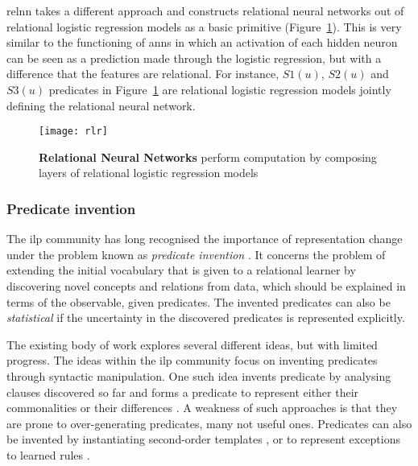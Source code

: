 \gls{relnn} takes a different approach and constructs relational neural networks out of relational logistic regression models as a basic primitive (Figure~\ref{fig:relnn}).
This is very similar to the functioning of \gls{ann}s in which an activation of each hidden neuron can be seen as a prediction made through the logistic regression, but with a difference that the features are relational.
For instance, $S1(u)$, $S2(u)$ and $S3(u)$ predicates in Figure~\ref{fig:relnn} are relational logistic regression models jointly defining the relational neural network.



\begin{figure}
	\centering
	\texttt{[image: rlr]}
	\caption[Relational Neural Networks]{\textbf{Relational Neural Networks} perform computation by composing layers of relational logistic regression models~\cite{Kazemi2018}\label{fig:relnn}}
\end{figure}




\subsubsection{Predicate invention}

The \gls{ilp} community has long recognised the importance of representation change under the problem known as \textit{predicate invention} \cite{Kramer1995}.
It concerns the problem of extending the initial vocabulary that is given to a relational learner by discovering novel concepts and relations from data, which should be explained in terms of the observable, given predicates.
The invented predicates can also be \textit{statistical} if the uncertainty in the discovered predicates is represented explicitly.


The existing body of work explores several different ideas, but with limited progress.
The ideas within the \gls{ilp} community focus on inventing predicates through syntactic manipulation.
One such idea invents predicate by analysing clauses discovered so far and forms a predicate to represent either their commonalities \cite{Wogulis1989} or their differences \cite{MuggletonBu88}.
A weakness of such approaches is that they are prone to over-generating predicates, many not useful ones.
Predicates can also be invented by instantiating second-order templates \cite{Silverstein91}, or to represent exceptions to learned rules \cite{Srinivasan92}.

